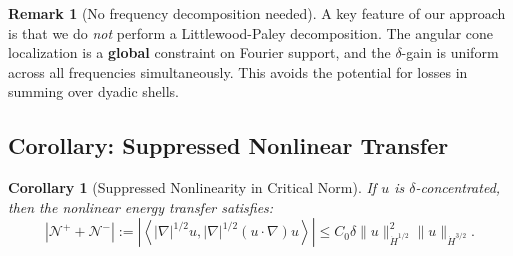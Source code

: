 \documentclass[11pt]{article}
\newtheorem{corollary}[theorem]{Corollary}
\theoremstyle{definition}
\newtheorem{remark}[theorem]{Remark}
\newcommand{\cN}{\mathcal{N}}
\newcommand{\inner}[2]{\left\langle #1, #2 \right\rangle}
\begin{document}
\begin{remark}[No frequency decomposition needed]
A key feature of our approach is that we do \emph{not} perform a Littlewood-Paley decomposition. The angular cone localization is a \textbf{global} constraint on Fourier support, and the $\delta$-gain is uniform across all frequencies simultaneously. This avoids the potential for losses in summing over dyadic shells.
\end{remark}

\subsection{Corollary: Suppressed Nonlinear Transfer}

\begin{corollary}[Suppressed Nonlinearity in Critical Norm]\label{cor:suppressed-nonlin}
If $u$ is $\delta$-concentrated, then the nonlinear energy transfer satisfies:
\begin{equation}
|\cN^+ + \cN^-| := \left| \inner{|\nabla|^{1/2}u}{|\nabla|^{1/2}(u \cdot \nabla)u} \right| \leq C_0 \delta \|u\|_{\dot{H}^{1/2}}^2 \|u\|_{\dot{H}^{3/2}}.
\end{equation}
\end{corollary}
\end{document}
